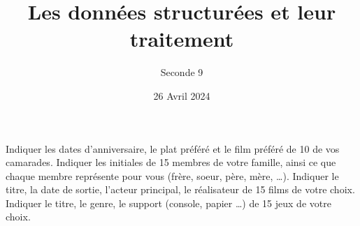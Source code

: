 \documentclass{exam}
\title{Les données structurées et leur traitement}
\date{26 Avril 2024}
\author{Seconde 9}
\begin{document}
\maketitle
\thispagestyle{head}

\begin{questions}
\question Indiquer les dates d'anniversaire, le plat préféré et le film préféré de 10 de vos camarades.
\makeemptybox{7cm}
\question Indiquer les initiales de 15 membres de votre famille, ainsi ce que chaque membre représente pour vous (frère, soeur, père, mère, \dots).
\makeemptybox{7cm}
\newpage
\question Indiquer le titre, la date de sortie, l'acteur principal, le réalisateur de 15 films de votre choix.
\makeemptybox{7cm}
\question Indiquer le titre, le genre, le support (console, papier \dots) de 15 jeux de votre choix.
\makeemptybox{7cm}
\end{questions}
\end{document}
